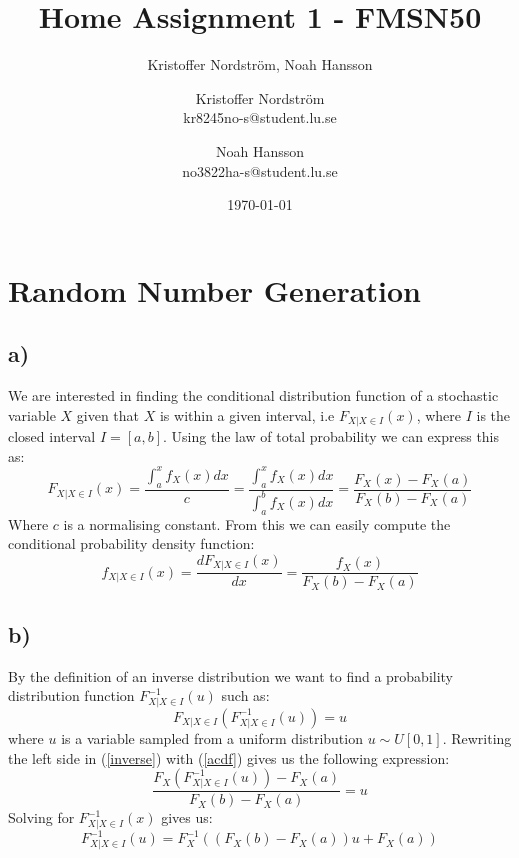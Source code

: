 \documentclass[a4paper]{article}
\title{Home Assignment 1 - FMSN50}
\author{Kristoffer Nordström, Noah Hansson}\author{Kristoffer Nordström \\ kr8245no-s@student.lu.se \and  Noah Hansson \\ no3822ha-s@student.lu.se}
\date{\today}
\begin{document}
\maketitle
\newpage

 
\section{Random Number Generation}\label{sec:RNG}
\subsection*{a)}
We are interested in finding the conditional distribution function of a stochastic variable $X$ given that $X$ is within a given interval, i.e $F_{X|X\in I}(x)$, where $I$ is the closed interval $I = [a,b]$. Using the law of total probability we can express this as:
\begin{equation}
    F_{X|X\in{I}}(x) = \frac{\int_a^xf_X(x)dx}{c} = \frac{\int_a^xf_X(x)dx}{\int_a^bf_X(x)dx} = \frac{F_X(x)-F_X(a)}{F_X(b)-F_X(a)}
    \label{acdf}
\end{equation}
Where $c$ is a normalising constant. From this we can easily compute the conditional probability density function:
\begin{equation}
    f_{X|X\in{I}}(x) = \frac{dF_{X|X\in{I}}(x)}{dx} = \frac{f_X(x)}{F_X(b)-F_X(a)}
\end{equation}

\subsection*{b)}
By the definition of an inverse distribution we want to find a probability distribution function $F_{X|X \in I}^{-1}(u)$ such as:
\begin{equation}
    F_{X|X \in I}(F_{X|X \in I}^{-1}(u)) = u
    \label{inverse}
\end{equation}
where $u$ is a variable sampled from a uniform distribution $u \sim U[0,1]$. Rewriting the left side in (\ref{inverse}) with (\ref{acdf}) gives us the following expression:
\begin{equation}
    \frac{F_X(F_{X|X\in I}^{-1}(u))-F_X(a)}{F_X(b)-F_X(a)} = u
\end{equation}
Solving for $F_{X|X\in I}^{-1}(x)$ gives us:
\begin{equation}
    F_{X|X\in I}^{-1}(u) = F_X^{-1}((F_X(b)-F_X(a))u + F_X(a))
    \label{finvers}
\end{equation}
\end{document}

